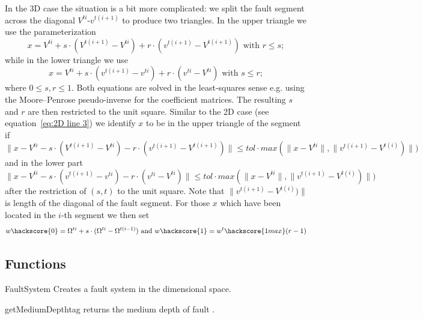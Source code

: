 In the 3D case the situation is a bit more complicated: we split the fault segment across 
the diagonal $V^{ti}$-$v^{t(i+1)}$ to produce two triangles. In the upper triangle we use the
parameterization 
\begin{equation}
x= V^{ti} + s \cdot (V^{t(i+1)}-V^{ti})  + r \cdot (v^{t(i+1)}-V^{t(i+1)})
\mbox{ with } r \le s; 
\label{eq:2D line 4}
\end{equation}
while in the lower triangle we use
\begin{equation}
x= V^{ti} +  s \cdot (v^{t(i+1)}-v^{ti}) + r \cdot (v^{ti}-V^{ti})
\mbox{ with } s \le r; 
\label{eq:2D line 4b}
\end{equation}
where $0\le s,r \le 1$. Both equations are solved in the least-squares sense e.g. using the Moore–Penrose pseudo-inverse for the coefficient matrices.  The resulting $s$ and $r$  are then restricted to the unit square. Similar to the 2D case (see equation~\ref{eq:2D line 3}) we identify $x$ to be in the upper triangle of the segment if
\begin{equation}
\|x- V^{ti} - s \cdot (V^{t(i+1)}-V^{ti})  - r \cdot (v^{t(i+1)}-V^{t(i+1)}) \|
\le tol \cdot  max(\|x-V^{ti} \|,\|v^{t(i+1)}-V^{t(i)})\|) 
\label{eq:2D line 4c}
\end{equation}
and in the lower part 
\begin{equation}
\|x-V^{ti} -  s \cdot (v^{t(i+1)}-v^{ti}) - r \cdot (v^{ti}-V^{ti}) \|
\le tol \cdot  max(\|x-V^{ti} \|,\|v^{t(i+1)}-V^{t(i)})\|)  
\label{eq:2D line 4d}
\end{equation}
after the restriction of $(s,t)$ to the unit square. Note that $\|v^{t(i+1)}-V^{t(i)})\|$ is length of the
diagonal of the fault segment. For those $x$ which have been located in the $i$-th segment  we then set
\begin{equation}
w\hackscore{0}=\Omega^{ti}+s \cdot (\Omega^{ti}-\Omega^{t(i-1)})
\mbox{ and }
w\hackscore{1}=w^t\hackscore{1max} (r-1) 
\label{eq:2D line 5}
\end{equation}


\subsection{Functions}

\begin{classdesc}{FaultSystem}{
}
Creates a fault system in the  dimensional space.
\end{classdesc}

\begin{methoddesc}[FaultSystem]{getMediumDepth}{tag}
returns the medium depth of fault .
\end{methoddesc}


